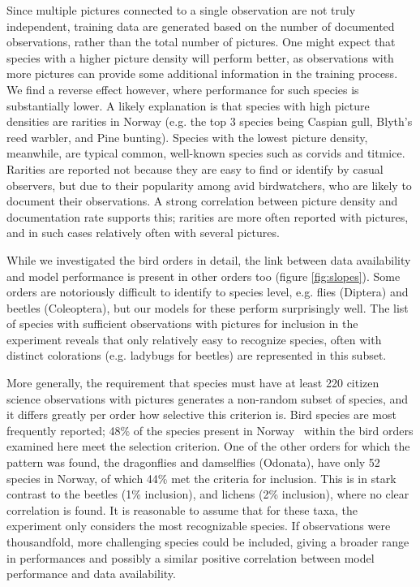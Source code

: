 \documentclass{article}
\begin{document}
Since multiple pictures connected to a single observation are not truly independent, training data are generated based on the number of documented observations, rather than the total number of pictures. One might expect that species with a higher picture density will perform better, as observations with more pictures can provide some additional information in the training process. We find a reverse effect however, where performance for such species is substantially lower. A likely explanation is that species with high picture densities are rarities in Norway (e.g. the top 3 species being Caspian gull, Blyth's reed warbler, and Pine bunting). Species with the lowest picture density, meanwhile, are typical common, well-known species such as corvids and titmice. Rarities are reported not because they are easy to find or identify by casual observers, but due to their popularity among avid birdwatchers, who are likely to document their observations. A strong correlation between picture density and documentation rate supports this; rarities are more often reported with pictures, and in such cases relatively often with several pictures.

While we investigated the bird orders in detail, the link between data availability and model performance is present in other orders too (figure \ref{fig:slopes}). Some orders are notoriously difficult to identify to species level, e.g. flies (Diptera) and beetles (Coleoptera), but our models for these perform surprisingly well. The list of species with sufficient observations with pictures for inclusion in the experiment reveals that only relatively easy to recognize species, often with distinct colorations (e.g. ladybugs for beetles) are represented in this subset.

More generally, the requirement that species must have at least 220 citizen science observations with pictures generates a non-random subset of species, and it differs greatly per order how selective this criterion is. Bird species are most frequently reported; 48\% of the species present in Norway~\cite{NBIC} within the bird orders examined here meet the selection criterion. One of the other orders for which the pattern was found, the dragonflies and damselflies (Odonata), have only 52 species in Norway, of which 44\% met the criteria for inclusion. This is in stark contrast to the beetles (1\% inclusion), and lichens (2\% inclusion), where no clear correlation is found. It is reasonable to assume that for these taxa, the experiment only considers the most recognizable species. If observations were thousandfold, more challenging species could be included, giving a broader range in performances and possibly a similar positive correlation between model performance and data availability.
\end{document}
